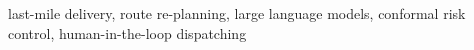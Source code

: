 \begin{abstract}
\end{abstract}

\begin{IEEEkeywords}
last-mile delivery, route re-planning, large language models, conformal risk control, human-in-the-loop dispatching
\end{IEEEkeywords}
